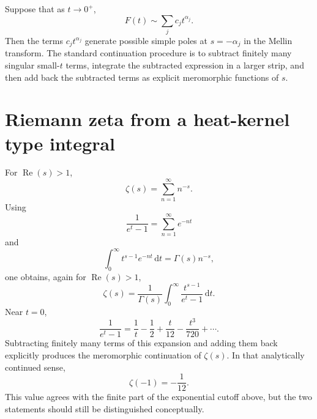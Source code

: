 \documentclass[11pt]{article}
\newcommand{\dd}{\,\mathrm{d}}
\newcommand{\Ree}{\operatorname{Re}}
\begin{document}
Suppose that as $t\to0^+$,
\begin{equation}
  F(t)\sim \sum_j c_j t^{\alpha_j}.
\end{equation}
Then the terms $c_j t^{\alpha_j}$ generate possible simple poles at $s=-\alpha_j$ in the Mellin transform. The standard continuation procedure is to subtract finitely many singular small-$t$ terms, integrate the subtracted expression in a larger strip, and then add back the subtracted terms as explicit meromorphic functions of $s$.

\section{Riemann zeta from a heat-kernel type integral}
For $\Ree(s)>1$,
\begin{equation}
  \zeta(s)=\sum_{n=1}^{\infty} n^{-s}.
\end{equation}
Using
\begin{equation}
  \frac{1}{e^t-1}=\sum_{n=1}^{\infty} e^{-nt}
\end{equation}
and
\begin{equation}
  \int_0^{\infty} t^{s-1}e^{-nt}\dd t=\Gamma(s)n^{-s},
\end{equation}
one obtains, again for $\Ree(s)>1$,
\begin{equation}
  \zeta(s)=\frac{1}{\Gamma(s)}\int_0^{\infty}\frac{t^{s-1}}{e^t-1}\dd t.
\end{equation}
Near $t=0$,
\begin{equation}
  \frac{1}{e^t-1}=\frac{1}{t}-\frac{1}{2}+\frac{t}{12}-\frac{t^3}{720}+\cdots.
\end{equation}
Subtracting finitely many terms of this expansion and adding them back explicitly produces the meromorphic continuation of $\zeta(s)$. In that analytically continued sense,
\begin{equation}
  \zeta(-1)=-\frac{1}{12}.
\end{equation}
This value agrees with the finite part of the exponential cutoff above, but the two statements should still be distinguished conceptually.
\end{document}
